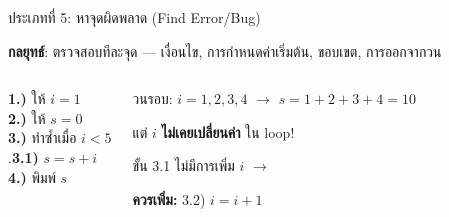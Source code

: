 \documentclass[11pt, aspectratio=169]{beamer}
\begin{document}
\begin{frame}{ประเภทที่ 5: หาจุดผิดพลาด (Find Error/Bug)}
  \begin{explanation}
    \textbf{กลยุทธ์}: ตรวจสอบทีละจุด — เงื่อนไข, การกำหนดค่าเริ่มต้น, ขอบเขต, การออกจากวน
  \end{explanation}

  \begin{columns}[T]
      \begin{pseudobox}
        \textbf{1.)} ให้ $i = 1$ \\
        \textbf{2.)} ให้ $s = 0$ \\
        \textbf{3.)} ทำซํ้าเมื่อ $i < 5$ \\
        .\qquad \textbf{3.1)} $s = s + i$ \\
        \textbf{4.)} พิมพ์ $s$
      \end{pseudobox}
      \begin{solbox}[อะไรผิด?]
        วนรอบ: $i=1,2,3,4$ $\rightarrow$ $s=1+2+3+4=10$

        แต่ $i$ \textbf{ไม่เคยเปลี่ยนค่า} ใน loop!

        ขั้น 3.1 ไม่มีการเพิ่ม $i$ \quad $\rightarrow$ 

        \textbf{ควรเพิ่ม:} 3.2) $i = i + 1$
      \end{solbox}
  \end{columns}
\end{frame}
\end{document}

